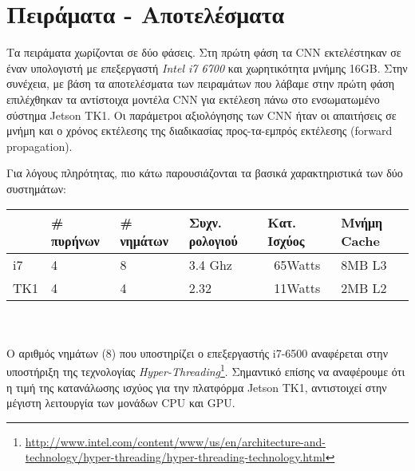 \chapter{Πειράματα - Αποτελέσματα}
\label{chapter:experiments}

Τα πειράματα χωρίζονται σε δύο φάσεις. Στη πρώτη φάση τα CNN εκτελέστηκαν
σε έναν υπολογιστή με επεξεργαστή \emph{Intel i7 6700} και χωρητικότητα μνήμης
16GB. Στην συνέχεια, με βάση τα αποτελέσματα των πειραμάτων που λάβαμε στην πρώτη φάση επιλέχθηκαν
τα αντίστοιχα μοντέλα CNN για εκτέλεση πάνω στο ενσωματωμένο σύστημα
Jetson TK1. Οι παράμετροι αξιολόγησης των CNN ήταν οι απαιτήσεις σε μνήμη και ο χρόνος εκτέλεσης
της διαδικασίας προς-τα-εμπρός εκτέλεσης (forward propagation).

Για λόγους πληρότητας, πιο κάτω παρουσιάζονται τα βασικά χαρακτηριστικά
των δύο συστημάτων:
\\

\begin{tabular}{ | l | l | l | l | l | l | }
  \hline
  \rowcolor{Gray}
  & \# πυρήνων & \# νημάτων & Συχν. ρολογιού & Κατ. Ισχύος & Μνήμη Cache \\
  \hline
  i7 & 4 & 8 & 3.4 Ghz & ~65Watts & 8MΒ L3\\
  \hline
  TK1 & 4 & 4 & 2.32 & ~11Watts & 2MB L2 \\
  \hline
\end{tabular}
\\\\
Ο αριθμός νημάτων (8) που υποστηρίζει ο επεξεργαστής i7-6500 αναφέρεται στην
υποστήριξη της τεχνολογίας \emph{Hyper-Threading}\footnote{\url{http://www.intel.com/content/www/us/en/architecture-and-technology/hyper-threading/hyper-threading-technology.html}}.
Σημαντικό επίσης να αναφέρουμε ότι η τιμή της κατανάλωσης ισχύος για την
πλατφόρμα Jetson TK1, αντιστοιχεί στην μέγιστη λειτουργία των μονάδων
CPU και GPU.



